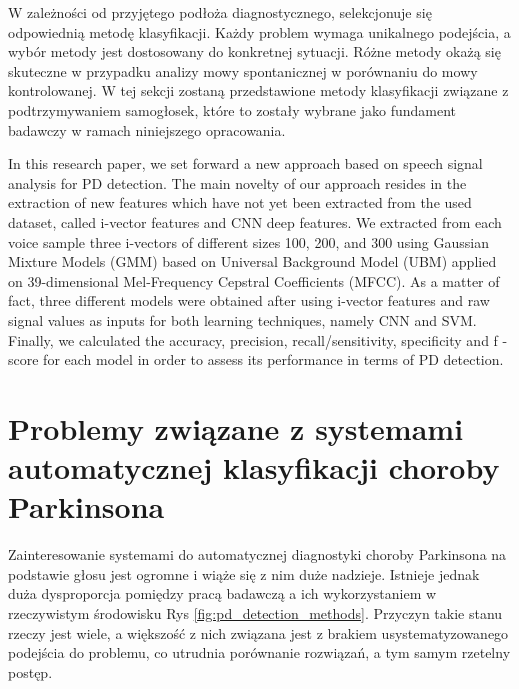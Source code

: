 W zależności od przyjętego podłoża diagnostycznego, selekcjonuje się odpowiednią metodę klasyfikacji.
Każdy problem wymaga unikalnego podejścia, a wybór metody jest dostosowany do konkretnej sytuacji.
Różne metody okażą się skuteczne w przypadku analizy mowy spontanicznej w porównaniu do mowy kontrolowanej.
W tej sekcji zostaną przedstawione metody klasyfikacji związane z podtrzymywaniem samogłosek, które to zostały wybrane jako
fundament badawczy w ramach niniejszego opracowania.



In this research paper, we set forward a new approach based on speech signal analysis for PD detection. The main novelty of our approach resides
in the extraction of new features which have not yet been extracted from the used dataset, called i-vector features and CNN
deep features. We extracted from each voice sample three i-vectors
of different sizes 100, 200, and 300 using Gaussian Mixture Models (GMM) based on Universal Background Model (UBM) applied
on 39-dimensional Mel-Frequency Cepstral Coefficients (MFCC). As
a matter of fact, three different models were obtained after using
i-vector features and raw signal values as inputs for both learning
techniques, namely CNN and SVM. Finally, we calculated the accuracy, precision, recall/sensitivity, specificity and f -score for each
model in order to assess its performance in terms of PD detection. \cite{2023_PD_voice}


\section{Problemy związane z systemami automatycznej klasyfikacji choroby Parkinsona}\label{sec:problemy}

Zainteresowanie systemami do automatycznej diagnostyki choroby Parkinsona na podstawie głosu jest ogromne i wiąże się z nim duże nadzieje.
Istnieje jednak duża dysproporcja pomiędzy pracą badawczą a ich wykorzystaniem w rzeczywistym środowisku Rys \ref{fig:pd_detection_methods}.
Przyczyn takie stanu rzeczy jest wiele, a większość z nich związana jest z brakiem usystematyzowanego podejścia do problemu, co utrudnia porównanie
rozwiązań, a tym samym rzetelny postęp.

